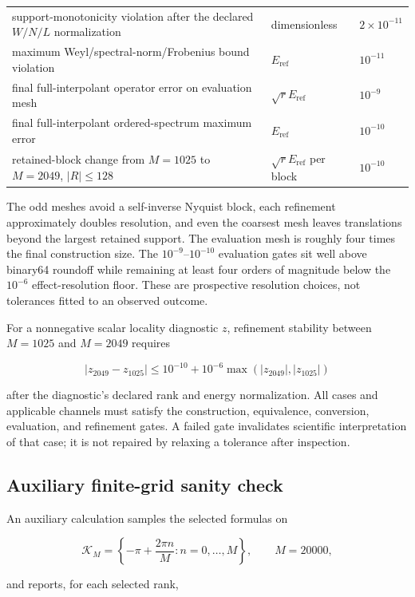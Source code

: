\documentclass[11pt]{article}
\begin{document}
\begin{center}
\begin{tabularx}{\textwidth}{YYY}
support-monotonicity violation after the declared $W/N/L$ normalization & dimensionless & $2\times10^{-11}$ \\
maximum Weyl/spectral-norm/Frobenius bound violation & $E_{\mathrm{ref}}$ & $10^{-11}$ \\
final full-interpolant operator error on evaluation mesh & $\sqrt rE_{\mathrm{ref}}$ & $10^{-9}$ \\
final full-interpolant ordered-spectrum maximum error & $E_{\mathrm{ref}}$ & $10^{-10}$ \\
retained-block change from $M=1025$ to $M=2049$, $\lvert R\rvert\leq128$ & $\sqrt rE_{\mathrm{ref}}$ per block & $10^{-10}$ \\
\bottomrule
\end{tabularx}
\end{center}

The odd meshes avoid a self-inverse Nyquist block, each refinement approximately doubles
resolution, and even the coarsest mesh leaves translations beyond the largest retained
support. The evaluation mesh is roughly four times the final construction size. The
$10^{-9}$--$10^{-10}$ evaluation gates sit well above binary64 roundoff while remaining
at least four orders of magnitude below the $10^{-6}$ effect-resolution floor. These are
prospective resolution choices, not tolerances fitted to an observed outcome.

For a nonnegative scalar locality diagnostic $z$, refinement stability between
$M=1025$ and $M=2049$ requires

\[
|z_{2049}-z_{1025}|\leq10^{-10}+10^{-6}
\max(|z_{2049}|,|z_{1025}|)
\]

after the diagnostic's declared rank and energy normalization. All cases and applicable
channels must satisfy the construction, equivalence, conversion, evaluation, and
refinement gates. A failed gate invalidates scientific interpretation of that case; it
is not repaired by relaxing a tolerance after inspection.

\subsection{Auxiliary finite-grid sanity check}

An auxiliary calculation samples the selected formulas on

\[
\mathcal K_M=\left\{-\pi+\frac{2\pi n}{M}:n=0,\ldots,M\right\},
\qquad M=20000,
\]

and reports, for each selected rank,
\end{document}
